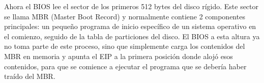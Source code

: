Ahora el BIOS lee el sector de los primeros 512 bytes del disco rígido.
Este sector se llama MBR (Master Boot Record) y normalmente contiene 2 componentes
principales: un pequeño programa de inicio específico de un sistema operativo en el comienzo,
seguido de la tabla de particiones del disco. El BIOS a esta altura ya no toma
parte de este proceso, sino que simplemente carga los contenidos del MBR en
memoria y apunta el EIP a la primera posición donde alojó esos contenidos,
para que se comience a ejecutar el programa que se debería haber traído del MBR.
